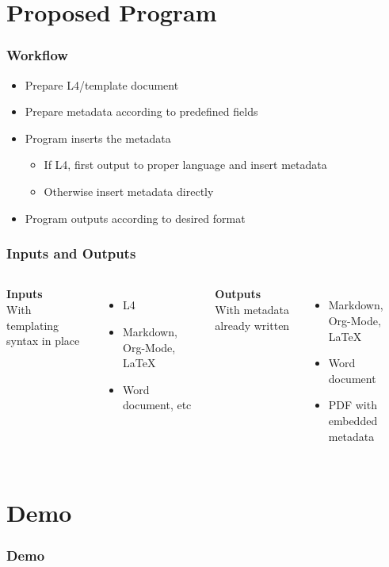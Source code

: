 \documentclass{beamer}
\begin{document}
\section{Proposed Program}
\begin{frame}
\frametitle{Workflow}
    \begin{itemize}
    \item Prepare L4/template document
    \item Prepare metadata according to predefined fields
    \item Program inserts the metadata
        \begin{itemize}
        \item If L4, first output to proper language and insert metadata
        \item Otherwise insert metadata directly
        \end{itemize}
    \item Program outputs according to desired format
    \end{itemize}
\end{frame}

\begin{frame}
\frametitle{Inputs and Outputs}
    \begin{columns}
        \textbf{Inputs} \\
        With templating syntax in place
        \begin{itemize}
        \item L4
        \item Markdown, Org-Mode, LaTeX
        \item Word document, etc
        \end{itemize}
        
        \textbf{Outputs} \\
        With metadata already written
        \begin{itemize}
        \item Markdown, Org-Mode, LaTeX
        \item Word document
        \item PDF with embedded metadata
        \end{itemize}
    \end{columns}
\end{frame}

\section{Demo}
\begin{frame}
\frametitle{Demo}
\end{frame}
\end{document}
